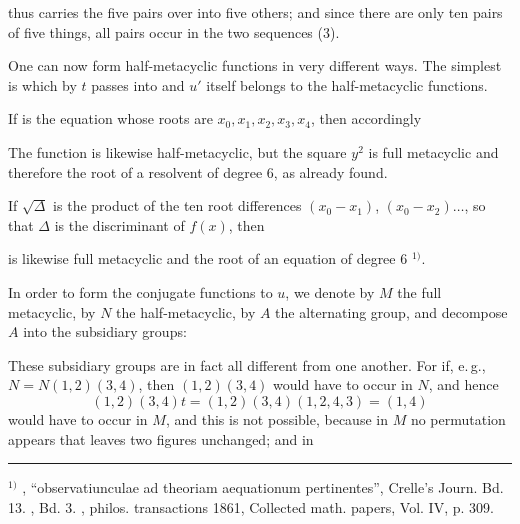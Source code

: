 thus carries the five pairs over into five others; and since there
are only ten pairs of five things, all pairs occur in the two
sequences (3).

One can now form half-metacyclic functions in very different
ways. The simplest is
which by $t$ passes into
and $u'$ itself belongs to the half-metacyclic functions.

If
is the equation whose roots are $x_0, x_1, x_2, x_3, x_4$, then accordingly

The function
is likewise half-metacyclic, but the square $y^2$ is full metacyclic
and therefore the root of a resolvent of degree 6,
as  already found.

If $\sqrt{\Delta}$ is the product of the ten root differences $(x_0 - x_1)$,
$(x_0 - x_2) \dots$, so that $\Delta$ is the discriminant of $f(x)$, then

is likewise full metacyclic and the root of an equation of degree 6 $^{1)}$.

In order to form the conjugate functions to $u$, we denote
by $M$ the full metacyclic, by $N$ the half-metacyclic,
by $A$ the alternating group, and decompose $A$ into the subsidiary groups:

These subsidiary groups are in fact all different from one another.
For if, e.\,g., $N = N(1,2)(3,4)$, then $(1,2)(3,4)$ would have to
occur in $N$, and hence
\[ (1,2)(3,4)t = (1,2)(3,4)(1,2,4,3) = (1,4) \]
would have to occur in $M$, and this is not possible, because in $M$ no
permutation appears that leaves two figures unchanged; and in

\par\noindent\rule{4cm}{0.4pt}\par
\noindent $^{1)}$ , ``observatiunculae ad theoriam aequationum pertinentes'',
Crelle's Journ. Bd. 13. , Bd. 3. , philos. transactions
 1861, Collected math. papers, Vol. IV, p. 309.
